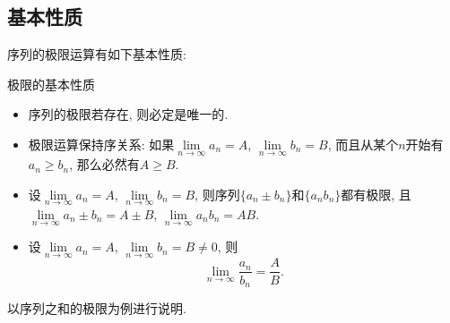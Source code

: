 \subsection{基本性质}
序列的极限运算有如下基本性质:

\begin{theorem}{极限的基本性质}
\begin{itemize}
\item 序列的极限若存在, 则必定是唯一的.
\item 极限运算保持序关系: 如果$\lim\limits_{n\to\infty}a_n=A$, $\lim\limits_{n\to\infty}b_n=B$, 而且从某个$n$开始有$a_n\geq b_n$, 那么必然有$A\geq B$.
\item 设$\lim\limits_{n\to\infty}a_n=A$, $\lim\limits_{n\to\infty}b_n=B$, 则序列$\{a_n\pm b_n\}$和$\{a_n b_n\}$都有极限, 且$\lim\limits_{n\to\infty}a_n\pm b_n=A\pm B$, $\lim\limits_{n\to\infty}a_nb_n=AB$.
\item 设$\lim\limits_{n\to\infty}a_n=A$, $\lim\limits_{n\to\infty}b_n=B\neq0$, 则
$$
\lim\limits_{n\to\infty}\frac{a_n}{b_n}=\frac{A}{B}.
$$
\end{itemize}
\end{theorem}

以序列之和的极限为例进行说明. 